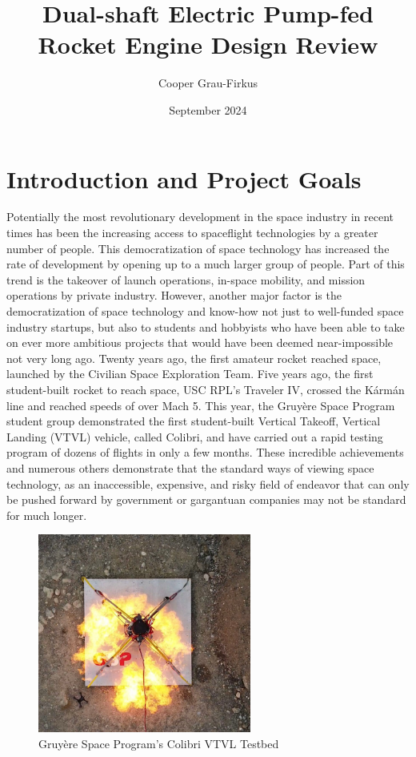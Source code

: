 \documentclass[12pt, letterpaper]{article}
\title{Dual-shaft Electric Pump-fed Rocket Engine Design Review}
\author{Cooper Grau-Firkus}
\date{September 2024}
\begin{document}
\maketitle
\tableofcontents

\section{Introduction and Project Goals}

Potentially the most revolutionary development in the space industry in recent times has been the increasing access to spaceflight technologies by a greater number of people. This democratization of space technology has increased the rate of development by opening up to a much larger group of people. Part of this trend is the takeover of launch operations, in-space mobility, and mission operations by private industry. However, another major factor is the democratization of space technology and know-how not just to well-funded space industry startups, but also to students and hobbyists who have been able to take on ever more ambitious projects that would have been deemed near-impossible not very long ago. Twenty years ago, the first amateur rocket reached space, launched by the Civilian Space Exploration Team. Five years ago, the first student-built rocket to reach space, USC RPL's Traveler IV, crossed the Kármán line and reached speeds of over Mach 5. This year, the Gruyère Space Program student group demonstrated the first student-built Vertical Takeoff, Vertical Landing (VTVL) vehicle, called Colibri, and have carried out a rapid testing program of dozens of flights in only a few months. These incredible achievements and numerous others demonstrate that the standard ways of viewing space technology, as an inaccessible, expensive, and risky field of endeavor that can only be pushed forward by government or gargantuan companies may not be standard for much longer.

\begin{figure}[!b]
    \centering
    \includegraphics[width=7cm]{Colibri.jpg}
    \caption{Gruyère Space Program's Colibri VTVL Testbed}
\end{figure}
\end{document}
